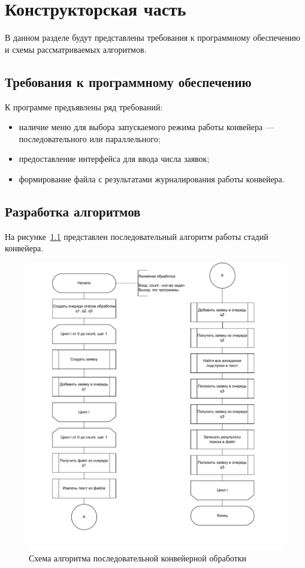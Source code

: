 \chapter{Конструкторская часть}

В данном разделе будут представлены требования к программному обеспечению и схемы рассматриваемых алгоритмов.

\section{Требования к программному обеспечению}

К программе предъявлены ряд требований:

\begin{itemize}
	\item наличие меню для выбора запускаемого режима работы конвейера --- последовательного или параллельного;
	\item предоставление интерфейса для ввода числа заявок;
	\item формирование файла с результатами журналирования работы конвейера.
\end{itemize}

\section{Разработка алгоритмов}

На рисунке~\ref{lin} представлен последовательный алгоритм работы стадий конвейера.

\begin{figure}[h]
	\centering
	\includegraphics[scale=0.9]{photos/linear}
	\caption{Схема алгоритма последовательной конвейерной обработки}
	\label{lin}
\end{figure}
\clearpage

